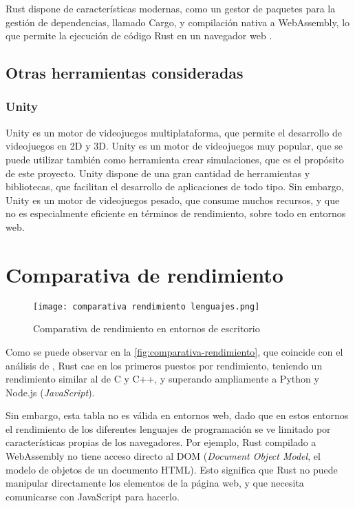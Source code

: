 Rust dispone de características modernas, como un gestor de paquetes para la gestión de dependencias, llamado Cargo, y compilación nativa a WebAssembly, lo que permite la ejecución de código Rust en un navegador web \autocite{WebAssembly}.

\subsection{Otras herramientas consideradas}
\subsubsection{Unity}
Unity es un motor de videojuegos multiplataforma, que permite el desarrollo de videojuegos en 2D y 3D. Unity es un motor de videojuegos muy popular, que se puede utilizar también como herramienta crear simulaciones, que es el propósito de este proyecto. Unity dispone de una gran cantidad de herramientas y bibliotecas, que facilitan el desarrollo de aplicaciones de todo tipo. Sin embargo, Unity es un motor de videojuegos pesado, que consume muchos recursos, y que no es especialmente eficiente en términos de rendimiento, sobre todo en entornos web.

\section{Comparativa de rendimiento}

\begin{figure}[H]
    \centering
    \texttt{[image: comparativa rendimiento lenguajes.png]}
    \caption{Comparativa de rendimiento en entornos de escritorio \autocite{zotero-16}}
    \label{fig:comparativa-rendimiento}
\end{figure}


\noindent Como se puede observar en la \autoref{fig:comparativa-rendimiento}, que coincide con el análisis de \autocite{samTop10Fastest2024}, Rust cae en los primeros puestos por rendimiento, teniendo un rendimiento similar al de C y C++, y superando ampliamente a Python y Node.js (\textit{JavaScript}).

Sin embargo, esta tabla no es válida en entornos web, dado que en estos entornos el rendimiento de los diferentes lenguajes de programación se ve limitado por características propias de los navegadores. Por ejemplo, Rust compilado a WebAssembly no tiene acceso directo al DOM (\textit{Document Object Model}, el modelo de objetos de un documento HTML). Esto significa que Rust no puede manipular directamente los elementos de la página web, y que necesita comunicarse con JavaScript para hacerlo. 

